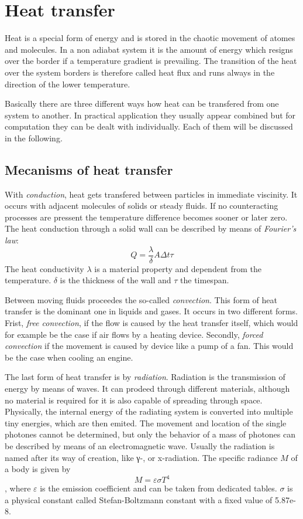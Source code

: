 \section{Heat transfer}
Heat is a special form of energy and is stored in the chaotic movement of atomes and molecules. In a non adiabat system it is the amount of energy which resigns over the border if a temperature gradient is prevailing. The transition of the heat over the system borders is therefore called heat flux and runs always in the direction of the lower temperature.

Basically there are three different ways how heat can be transfered from one system to another. In practical application they usually appear combined but for computation they can be dealt with individually. Each of them will be discussed in the following.
\subsection{Mecanisms of heat transfer}
With \emph{conduction}, heat gets transfered between particles in immediate viscinity. It occurs with adjacent molecules of solids or steady fluids. If no counteracting processes are pressent the temperature difference becomes sooner or later zero. The heat conduction through a solid wall can be described by means of \emph{Fourier's law}:
\begin{equation}
Q = \frac{\lambda}{\delta} A \Delta t \tau
\end{equation}
The heat conductivity $\lambda$ is a material property and dependent from the temperature. $\delta$ is the thickness of the wall and $\tau$ the timespan.

Between moving fluids proceedes the so-called \emph{convection}. This form of heat transfer is the dominant one in liquids and gases. It occurs in two different forms. Frist, \emph{free convection}, if the flow is caused by the heat transfer itself, which would for example be the case if air flows by a heating device. Secondly, \emph{forced convection} if the movement is caused by device like a pump of a fan. This would be the case when cooling an engine. 

The last form of heat transfer is by \emph{radiation}. Radiation is the transmission of energy by means of waves. It can prodeed through different materials, although no material is required for it is also capable of spreading through space. Physically, the internal energy of the radiating system is converted into multiple tiny energies, which are then emited. The movement and location of the single photones cannot be determined, but only the behavior of a mass of photones can be described by means of an electromagnetic wave. Usually the radiation is named after its way of creation, like γ-, or x-radiation. 
The specific radiance $M$ of a body is given by
\begin{equation}
M = \varepsilon \sigma T^4
\end{equation},
where $\varepsilon$ is the emission coefficient and can be taken from dedicated tables. $\sigma$ is a physical constant called Stefan-Boltzmann constant with a fixed value of 5.87e-8.
